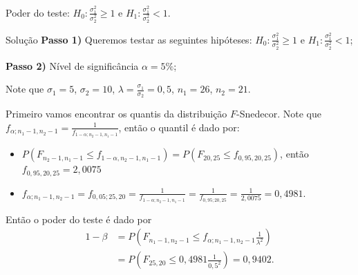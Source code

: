 \documentclass[9pt]{beamer}
\begin{document}
\begin{frame}{Poder do teste: $H_0:\frac{\sigma_1^2}{\sigma_2^2} \geq 1$ e $H_1:\frac{\sigma_1^2}{\sigma_2^2} < 1$.}

\small
\begin{block}{Solução}
	\textbf{Passo 1)} Queremos testar as seguintes hipóteses: $H_0: \frac{\sigma_1^2}{\sigma_2^2} \geq 1$ e $H_1: \frac{\sigma_1^2}{\sigma_2^2} < 1$;
	
	\textbf{Passo 2)} Nível de significância $\alpha=5\%$;
	
	Note que $\sigma_1=5$, $\sigma_2=10$, $\lambda =  \frac{\sigma_1}{\sigma_2} = 0,5$, $n_1 = 26$, $n_2 = 21$.
	
	Primeiro vamos encontrar os quantis da distribuição $F$-Snedecor. Note que $f_{\alpha; n_1-1, n_2-1} = \frac{1}{f_{1-\alpha; n_2-1, n_1-1}}$, então o quantil é dado por:
	\begin{itemize}
		\item $P\left(F_{n_2-1, n_1-1} \leq f_{1-\alpha, n_2-1, n_1-1} \right) = P\left(F_{20, 25} \leq f_{0,95, 20, 25} \right)$, então $f_{0,95, 20, 25} = 2,0075$
		\item $f_{\alpha; n_1-1, n_2-1} = f_{0,05; 25, 20} = \frac{1}{f_{1-\alpha; n_2-1, n_1-1}} = \frac{1}{f_{0,95; 20, 25}} = \frac{1}{2,0075}=0,4981$.
	\end{itemize}

	Então o poder do teste é dado por
	\begin{align*}
		1-\beta &= P\left(F_{n_1-1, n_2-1} \leq f_{\alpha;n_1-1, n_2-1}  \frac{1}{\lambda^2}\right)\\
		 &= P\left(F_{25, 20} \leq 0,4981  \frac{1}{0,5^2}\right)=0,9402.
	\end{align*}
\end{block}
\normalsize
\end{frame}
\end{document}
